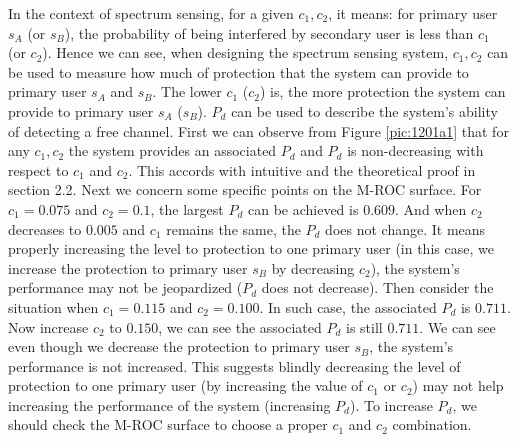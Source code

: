 In the context of spectrum sensing, for a given $c_1, c_2$, it means: for primary user $s_A$ (or $s_B$), the probability of being interfered by secondary user is less than $c_1$ (or $c_2$). Hence we can see, when designing the spectrum sensing system,  $c_1, c_2$ can be used to measure how much of protection that the system can provide to primary user $s_A$ and $s_B$.  The lower $c_1$ ($c_2$) is, the more protection the system can provide to primary user $s_A$ ($s_B$). $P_d$ can be used to describe the system's ability of detecting a free channel.   First we can observe from Figure \ref{pic:1201a1} that for any $c_1, c_2$ the system provides an associated $P_d$ and $P_d$ is non-decreasing with respect to $c_1$ and $c_2$. This accords with intuitive and the theoretical proof in section 2.2.     
Next we concern some specific points on the M-ROC surface. For $c_1 = 0.075$ and $c_2  = 0.1$, the largest $P_d$ can be achieved is $0.609$. And when $c_2$ decreases to $0.005$ and  $c_1$ remains the same, the $P_d$ does not change.   
 It means properly increasing the level to protection to one primary user (in this case, we increase the protection to primary user $s_B$ by decreasing $c_2$), the system's performance may not be jeopardized ($P_d$ does not decrease).  
Then consider the situation when $c_1 = 0.115$ and $c_2 = 0.100$. In such case, the associated $P_d$ is $0.711$. Now increase $c_2$ to $0.150$, we can see the associated $P_d$ is still $0.711$. We can see even though we decrease the protection to primary user $s_B$, the system's performance is not increased.  
This suggests blindly decreasing the level of protection to one primary user (by increasing the value of $c_1$ or $c_2$) may not help increasing the performance of the system (increasing $P_d$). To increase $P_d$, we should check the M-ROC surface to choose a proper $c_1$ and $c_2$ combination.

